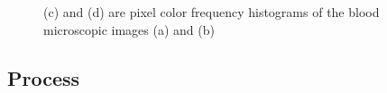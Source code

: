\documentclass[diagnostics,article,submit,pdftex,moreauthors]{Definitions/mdpi}
\begin{document}
\begin{figure}[!h]
  \centering
  \quad 
  \quad  
  \quad 
  \quad  
  \caption{(c) and (d) are pixel color frequency histograms of the blood microscopic images (a) and (b)}
\end{figure}

\subsection{Process}
\end{document}
